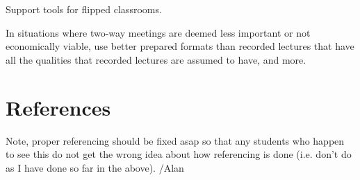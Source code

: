 \documentclass[a4paper,10pt]{article}
\begin{document}
Support tools for flipped classrooms.

In situations where two-way meetings are deemed less important or not economically viable, use better prepared formats than recorded lectures that have all the qualities that recorded lectures are assumed to have, and more.


\section{References}

Note, proper referencing should be fixed asap so that any students who happen to see this do not get the wrong idea about how referencing is done (i.e. don't do as I have done so far in the above). /Alan
\end{document}
